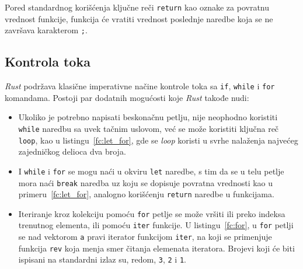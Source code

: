 \documentclass[12pt,oneside]{memoir}
\begin{document}


\noindent
Pored standardnog korišćenja ključne reči \texttt{return} kao oznake za povratnu vrednost funkcije,
funkcija će vratiti vrednost poslednje naredbe koja se ne završava karakterom \texttt{;}.

\subsection{Kontrola toka}
\emph{Rust} podržava klasične imperativne načine kontrole toka sa \texttt{if},
\texttt{while} i \texttt{for} komandama. Postoji par dodatnih mogućosti
koje \emph{Rust} takođe nudi:

\begin{itemize}
  \item Ukoliko je potrebno napisati beskonačnu petlju, nije neophodno koristiti
        \texttt{while} naredbu sa uvek tačnim uslovom, već se može koristiti
        ključna reč \texttt{loop}, kao u listingu~\ref{fc:let_for}, gde se
        \emph{loop} koristi u svrhe nalaženja najvećeg zajedničkog delioca
        dva broja.
  \item I \texttt{while} i \texttt{for} se mogu naći u okviru \texttt{let}
        naredbe, s tim da se u telu petlje mora naći \texttt{break} naredba
        uz koju se dopisuje povratna vrednosti kao u primeru~\ref{fc:let_for},
        analogno korišćenju \texttt{return}
        naredbe u funkcijama.
  \item Iteriranje kroz kolekciju pomoću \texttt{for} petlje se može vršiti ili
        preko indeksa trenutnog elementa, ili pomoću \texttt{iter} funkcije.
        U listingu~\ref{fc:for}, u \texttt{for} petlji se nad
        vektorom \texttt{a} pravi iterator funkcijom \texttt{iter},
        na koji se primenjuje funkcija \texttt{rev} koja
        menja smer čitanja elemenata iteratora. Brojevi
        koji će biti ispisani na standardni izlaz su, redom, \texttt{3},
        \texttt{2} i \texttt{1}.
\end{itemize}




\end{document}
